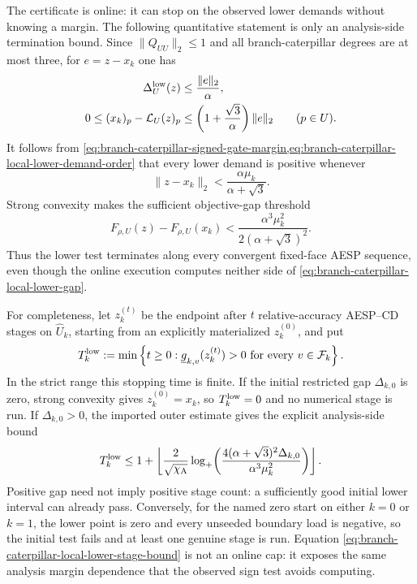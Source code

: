 The certificate is online: it can stop on the observed lower demands without
knowing a margin.  The following quantitative statement is only an
analysis-side termination bound.  Since $\lVert Q_{UU}\rVert_2\leq1$ and all
branch-caterpillar degrees are at most three, for
$e=z-x_k$ one has
\begin{align}
 \Delta_U^{\rm low}(z)
 &\leq\frac{\lVert e\rVert_2}{\alpha},
 \notag\\
 0\leq (x_k)_p-\mathcal L_U(z)_p
 &\leq\left(1+\frac{\sqrt3}{\alpha}\right)
        \lVert e\rVert_2
 \qquad(p\in U).
 \label{eq:branch-caterpillar-local-lower-error}
\end{align}
It follows from
\cref{eq:branch-caterpillar-signed-gate-margin,eq:branch-caterpillar-local-lower-demand-order}
that every lower demand is positive whenever
\begin{equation}
 \lVert z-x_k\rVert_2
 <\frac{\alpha\mu_k}{\alpha+\sqrt3}.
 \label{eq:branch-caterpillar-local-lower-neighborhood}
\end{equation}
Strong convexity makes the sufficient objective-gap threshold
\begin{equation}
 F_{\rho,U}(z)-F_{\rho,U}(x_k)
 <\frac{\alpha^3\mu_k^2}
         {2(\alpha+\sqrt3)^2}.
 \label{eq:branch-caterpillar-local-lower-gap}
\end{equation}
Thus the lower test terminates along every convergent fixed-face AESP
sequence, even though the online execution computes neither side of
\cref{eq:branch-caterpillar-local-lower-gap}.

For completeness, let $z_k^{(t)}$ be the endpoint after $t$ relative-accuracy
AESP--CD stages on $\widehat U_k$, starting from an explicitly materialized
$z_k^{(0)}$, and put
\begin{equation}
 T_k^{\rm low}:=\min\left\{t\geq0:
  \underline g_{k,v}(z_k^{(t)})>0
  \text{ for every }v\in\mathcal F_k\right\}.
 \label{eq:branch-caterpillar-local-lower-stopping-time}
\end{equation}
In the strict range this stopping time is finite.  If the initial restricted
gap $\Delta_{k,0}$ is zero, strong convexity gives
$z_k^{(0)}=x_k$, so $T_k^{\rm low}=0$ and no numerical stage is run.  If
$\Delta_{k,0}>0$, the imported outer estimate gives the explicit
analysis-side bound
\begin{equation}
 T_k^{\rm low}\leq
 1+\left\lfloor\frac{2}{\sqrt{\chi_{\rm A}}}
 \log_+\!\left(
  \frac{4(\alpha+\sqrt3)^2\Delta_{k,0}}
       {\alpha^3\mu_k^2}
            \right)\right\rfloor.
 \label{eq:branch-caterpillar-local-lower-stage-bound}
\end{equation}
Positive gap need not imply positive stage count: a sufficiently good initial
lower interval can already pass.  Conversely, for the named zero start on
either $k=0$ or $k=1$, the lower point is zero and every unseeded boundary
load is negative, so the initial test fails and at least one genuine stage is
run.  Equation
\cref{eq:branch-caterpillar-local-lower-stage-bound} is not an online cap:
it exposes the same analysis margin dependence that the observed sign test
avoids computing.

